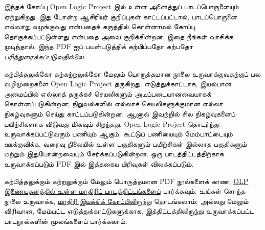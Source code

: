\documentclass[../include/open-logic-part]{subfiles}
\begin{document}
\clearpage

\begin{editorial}
இந்தக் கோப்பு Open Logic Project இல் உள்ள அனைத்துப் பாடப்பொருளையும்
ஏற்றுகிறது. இது போன்ற ஆசிரியர் குறிப்புகள் காட்டப்பட்டால்,
பாடப்பொருளை எவ்வாறு வழங்குவது என்பதைக் கருத்தில் கொள்ளாமல்
கோப்பு தொகுக்கப்பட்டுள்ளது என்பதை அவை குறிக்கின்றன.
இதை நீங்கள் வாசிக்க முடிந்தால், இந்த PDF ஐப் பயன்படுத்திக்
கற்பிப்பதோ கற்பதோ \emph{பரிந்துரைக்கப்படுவதில்லை}.

கற்பித்தலுக்கோ தற்கற்றலுக்கோ மேலும் பொருத்தமான நூலை
உருவாக்குவதற்குப் பல வழிமுறைகளை Open Logic Project தருகிறது.
எடுத்துக்காட்டாக, இயல்பான அமைப்பில் எல்லாத் தருக்கச் செயலிகளும்
அடிப்படையானவையாகக் கொள்ளப்படுகின்றன; நிறுவல்களில் எல்லாச்
செயலிகளுக்குமான எல்லா நிகழ்வுகளும் செய்து காட்டப்படுகின்றன.
ஆனால் இவற்றில் சில நிகழ்வுகளைப் பயிற்சிகளாக விடுவது மிகவும்
சிறந்தது. Open Logic Project தொடர்ந்து உருவாக்கப்பட்டுவரும்
பணியும் ஆகும். கூட்டுப் பணியையும் மேம்பாட்டையும் ஊக்குவிக்க,
வரைவு நிலையில் உள்ள பகுதிகளும் பயிற்சிகள் இல்லாத பகுதிகளும்
மற்றும் இதுபோன்றவையும் சேர்க்கப்படுகின்றன. ஒரு பாடத்திட்டத்திற்காக
உருவாக்கப்படும் PDF இல் இத்தகைய பிரிவுகள் விலக்கப்படும்.

கற்பித்தலுக்கும் கற்றலுக்கும் மேலும் பொருத்தமான PDF நூல்களைக்
காண, \href{http://builds.openlogicproject.org/}{OLP இணையதளத்தில் உள்ள மாதிரிப் பாடத்திட்டங்களைப்}
பார்க்கவும். உங்கள் சொந்த நூலை உருவாக்க,
\href{https://github.com/OpenLogicProject/OpenLogic/tree/master/courses/sample}{மாதிரி இயக்கிக் கோப்பிலிருந்து}
தொடங்கலாம்; அல்லது மேலும் விரிவான, மேம்பட்ட எடுத்துக்காட்டுகளுக்காக,
இத்திட்டத்திலிருந்து உருவாக்கப்பட்ட பாடநூல்களின் மூலங்களைப் பார்க்கலாம்.
\end{editorial}


















\end{document}

